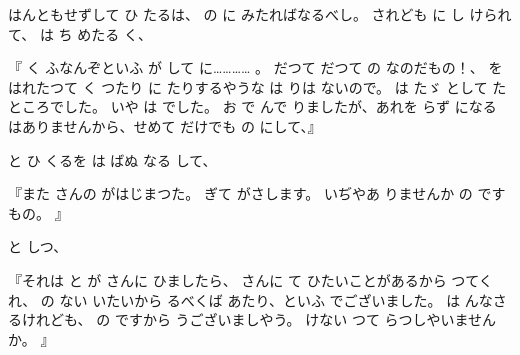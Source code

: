 
はんともせずして
ひ
たるは、
の
に
みたればなるべし。
されども
に
し
けられて、
は
ち
めたる
く、

『
く
ふなんぞといふ
が
して
に………… 。
だつて
だつて
の
なのだもの！、
を
はれたつて
く
つたり
に
たりするやうな
は
りは
ないので。
は
たゞ
として
たところでした。
いや
は
でした。
お
で
んで
りましたが、あれを
らず
になる
はありませんから、せめて
だけでも
の
にして、』

と
ひ
くるを
は
ばぬ
なる
して、

『また
さんの
がはじまつた。
ぎて
がさします。
いぢやあ
りませんか
の
ですもの。
』

と
しつ、

『それは
と
が
さんに
ひましたら、
さんに
て
ひたいことがあるから
つてくれ、
の
ない
いたいから
るべくば
あたり、といふ
でございました。
は
んなさるけれども、
の
ですから
うございましやう。
けない
つて
らつしやいませんか。
』

